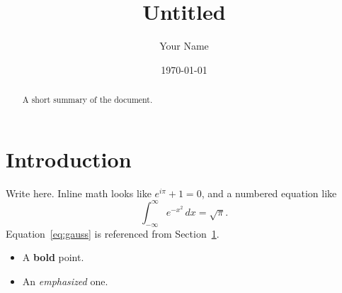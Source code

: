 \documentclass[11pt]{article}
\title{Untitled}
\author{Your Name}
\date{\today}
\begin{document}
\maketitle

\begin{abstract}
A short summary of the document.
\end{abstract}

\section{Introduction}\label{sec:intro}
Write here. Inline math looks like $e^{i\pi} + 1 = 0$, and a numbered equation like
\begin{equation}
  \int_{-\infty}^{\infty} e^{-x^2}\,dx = \sqrt{\pi}. \label{eq:gauss}
\end{equation}
Equation~\eqref{eq:gauss} is referenced from Section~\ref{sec:intro}.

\begin{itemize}
  \item A \textbf{bold} point.
  \item An \emph{emphasized} one.
\end{itemize}
\end{document}
